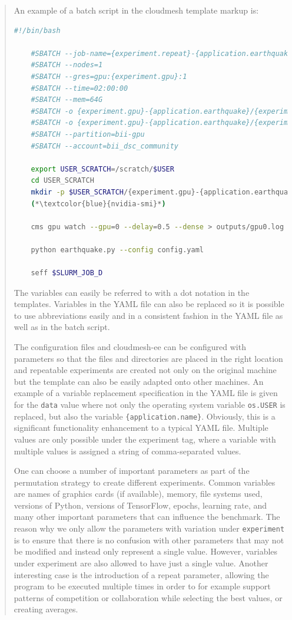 \documentclass[utf8]{FrontiersinVancouver} %
\begin{document}
\begin{quote}
An example of a batch script in the cloudmesh template markup  is:

\begin{lstlisting}[language=sh]
    #!/bin/bash

    #SBATCH --job-name={experiment.repeat}-{application.earthquake}
    #SBATCH --nodes=1
    #SBATCH --gres=gpu:{experiment.gpu}:1
    #SBATCH --time=02:00:00
    #SBATCH --mem=64G
    #SBATCH -o {experiment.gpu}-{application.earthquake}/{experiment.repeat}-%j.out
    #SBATCH -o {experiment.gpu}-{application.earthquake}/{experiment.repeat}-%j.err
    #SBATCH --partition=bii-gpu
    #SBATCH --account=bii_dsc_community

    export USER_SCRATCH=/scratch/$USER
    cd USER_SCRATCH
    mkdir -p $USER_SCRATCH/{experiment.gpu}-{application.earthquake}/%j.out
    (*\textcolor{blue}{nvidia-smi}*)

    cms gpu watch --gpu=0 --delay=0.5 --dense > outputs/gpu0.log &

    python earthquake.py --config config.yaml

    seff $SLURM_JOB_D
\end{lstlisting}

The variables can easily be referred to with a dot notation in the templates.  Variables in the YAML file can also be replaced so it is possible to use abbreviations easily and in a consistent fashion in the YAML file as well as in the batch script.

The configuration files and cloudmesh-ee can be configured with parameters so that the files and directories are placed in the right location and repeatable experiments are created not only on the original machine but the template can also be easily adapted onto other machines. An example of a variable replacement specification in the YAML file is given for the \verb|data| value where not only the operating system variable \verb|os.USER| is replaced, but also the variable \verb|{application.name}|. Obviously, this is a significant functionality enhancement to a typical YAML file.  Multiple values are only possible under the experiment tag, where a variable with multiple values is assigned a string of comma-separated values.

One can choose a number of important parameters as part of the permutation strategy to create different experiments. Common variables are names of graphics cards (if available), memory, file systems used, versions of Python, versions of TensorFlow, epochs, learning rate, and many other important parameters that can influence the benchmark.  The reason why we only allow the parameters with variation under \verb|experiment| is to ensure that there is no confusion with other parameters that may not be modified and instead only represent a single value. However, variables under experiment are also allowed to have just a single value.  Another interesting case is the introduction of a repeat parameter, allowing the program to be executed multiple times in order to for example support patterns of competition or collaboration while selecting the best values, or creating averages.



\end{quote}
\end{document}
